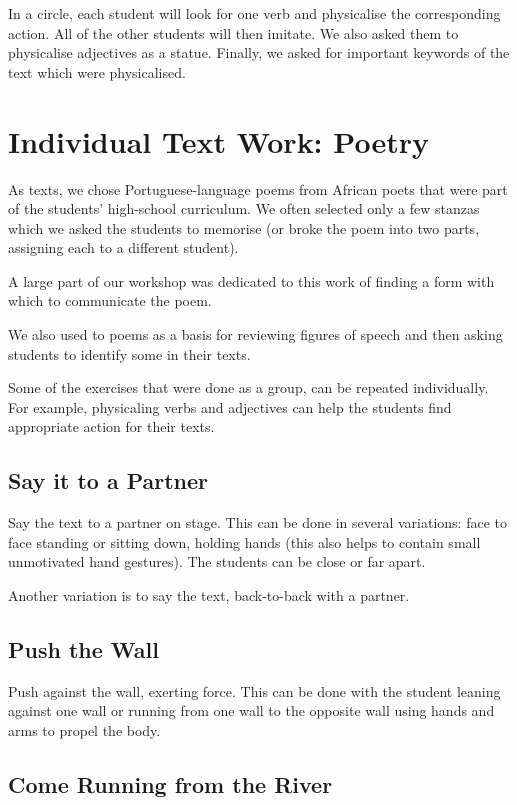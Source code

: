 \documentclass[article,twocolumn,twoside]{memoir}
\begin{document}
In a circle, each student will look for one verb and physicalise the
corresponding action. All of the other students will then imitate. We also
asked them to physicalise adjectives as a statue. Finally, we asked for
important keywords of the text which were physicalised.

\section{Individual Text Work: Poetry}

As texts, we chose Portuguese-language poems from African poets that were part
of the students' high-school curriculum. We often selected only a few stanzas
which we asked the students to memorise (or broke the poem into two parts,
assigning each to a different student).

A large part of our workshop was dedicated to this work of finding a form with
which to communicate the poem.

We also used to poems as a basis for reviewing figures of speech and then
asking students to identify some in their texts.

Some of the exercises that were done as a group, can be repeated individually.
For example, physicaling verbs and adjectives can help the students find
appropriate action for their texts.

\subsection{Say it to a Partner}

Say the text to a partner on stage. This can be done in several variations:
face to face standing or sitting down, holding hands (this also helps to
contain small unmotivated hand gestures). The students can be close or far apart.

Another variation is to say the text, back-to-back with a partner.

\subsection{Push the Wall}

Push against the wall, exerting force. This can be done with the student
leaning against one wall or running from one wall to the opposite wall using
hands and arms to propel the body.

\subsection{Come Running from the River}
\end{document}
